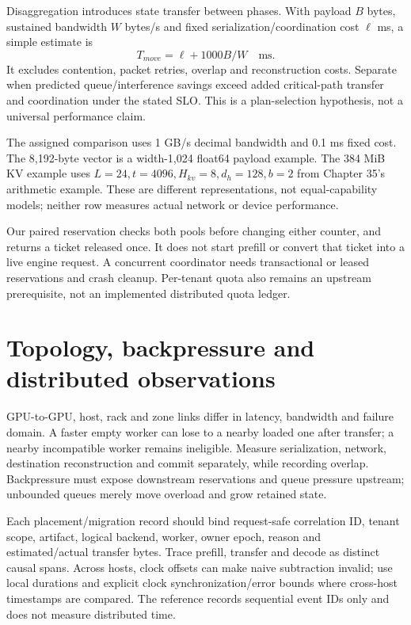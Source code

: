 Disaggregation introduces state transfer between phases. With payload $B$
bytes, sustained bandwidth $W$ bytes/s and fixed serialization/coordination
cost $\ell$ ms, a simple estimate is
\[
 T_{move}=\ell+1000 B/W\quad\text{ms}.
\]
It excludes contention, packet retries, overlap and reconstruction costs.
Separate when predicted queue/interference savings exceed added critical-path
transfer and coordination under the stated SLO. This is a plan-selection
hypothesis, not a universal performance claim.

\begin{center}\end{center}
The assigned comparison uses 1 GB/s decimal bandwidth and 0.1 ms fixed cost.
The 8,192-byte vector is a width-1,024 float64 payload example. The 384 MiB KV
example uses $L=24,t=4096,H_{kv}=8,d_h=128,b=2$ from Chapter 35's arithmetic
example. These are different representations, not equal-capability models;
neither row measures actual network or device performance.


Our paired reservation checks both pools before changing either counter, and
returns a ticket released once. It does not start prefill or convert that ticket
into a live engine request. A concurrent coordinator needs transactional or
leased reservations and crash cleanup. Per-tenant quota also remains an
upstream prerequisite, not an implemented distributed quota ledger.

\section{Topology, backpressure and distributed observations}
\label{evod46:observe}
GPU-to-GPU, host, rack and zone links differ in latency, bandwidth and failure
domain. A faster empty worker can lose to a nearby loaded one after transfer;
a nearby incompatible worker remains ineligible. Measure serialization,
network, destination reconstruction and commit separately, while recording
overlap. Backpressure must expose downstream reservations and queue pressure
upstream; unbounded queues merely move overload and grow retained state.

Each placement/migration record should bind request-safe correlation ID,
tenant scope, artifact, logical backend, worker, owner epoch, reason and
estimated/actual transfer bytes. Trace prefill, transfer and decode as distinct
causal spans. Across hosts, clock offsets can make naive subtraction invalid;
use local durations and explicit clock synchronization/error bounds where
cross-host timestamps are compared. The reference records sequential event
IDs only and does not measure distributed time.

